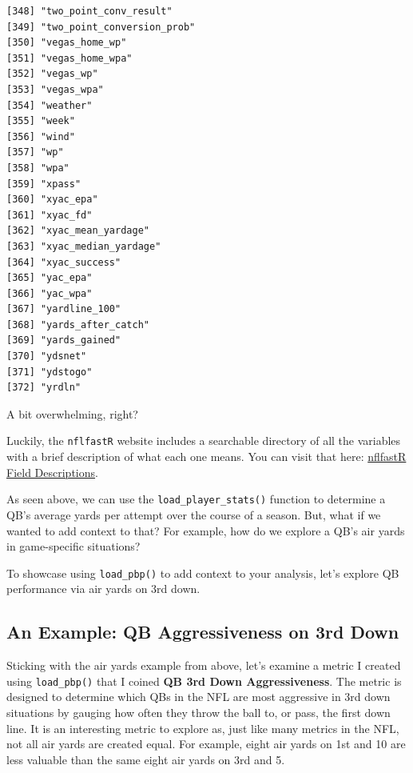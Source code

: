 \documentclass[
  letterpaper,
]{krantz}
\begin{document}
\begin{verbatim}
[348] "two_point_conv_result"               
[349] "two_point_conversion_prob"           
[350] "vegas_home_wp"                       
[351] "vegas_home_wpa"                      
[352] "vegas_wp"                            
[353] "vegas_wpa"                           
[354] "weather"                             
[355] "week"                                
[356] "wind"                                
[357] "wp"                                  
[358] "wpa"                                 
[359] "xpass"                               
[360] "xyac_epa"                            
[361] "xyac_fd"                             
[362] "xyac_mean_yardage"                   
[363] "xyac_median_yardage"                 
[364] "xyac_success"                        
[365] "yac_epa"                             
[366] "yac_wpa"                             
[367] "yardline_100"                        
[368] "yards_after_catch"                   
[369] "yards_gained"                        
[370] "ydsnet"                              
[371] "ydstogo"                             
[372] "yrdln"                               
\end{verbatim}

A bit overwhelming, right?

Luckily, the \texttt{nflfastR} website includes a searchable directory
of all the variables with a brief description of what each one means.
You can visit that here:
\href{https://www.nflfastr.com/articles/field_descriptions.html}{nflfastR
Field Descriptions}.

As seen above, we can use the \texttt{load\_player\_stats()} function to
determine a QB's average yards per attempt over the course of a season.
But, what if we wanted to add context to that? For example, how do we
explore a QB's air yards in game-specific situations?

To showcase using \texttt{load\_pbp()} to add context to your analysis,
let's explore QB performance via air yards on 3rd down.

\hypertarget{an-example-qb-aggressiveness-on-3rd-down}{%
\subsection{An Example: QB Aggressiveness on 3rd
Down}\label{an-example-qb-aggressiveness-on-3rd-down}}

Sticking with the air yards example from above, let's examine a metric I
created using \texttt{load\_pbp()} that I coined \textbf{QB 3rd Down
Aggressiveness}. The metric is designed to determine which QBs in the
NFL are most aggressive in 3rd down situations by gauging how often they
throw the ball to, or pass, the first down line. It is an interesting
metric to explore as, just like many metrics in the NFL, not all air
yards are created equal. For example, eight air yards on 1st and 10 are
less valuable than the same eight air yards on 3rd and 5.
\end{document}
